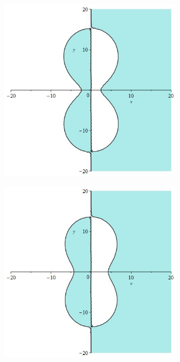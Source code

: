 \documentclass[12pt]{article}
\begin{document}
\begin{figure}[H]
\begin{subfigure}{0.24\textwidth}
    \end{subfigure}
    \begin{subfigure}{0.24\textwidth}
        \includegraphics[width=0.9\linewidth]{stabrks3_95i.jpg}
    \end{subfigure}
    \begin{subfigure}{0.24\textwidth}
        \includegraphics[width=0.9\linewidth]{stabrks3_10i.jpg}

\end{subfigure}
\end{figure}
\end{document}
